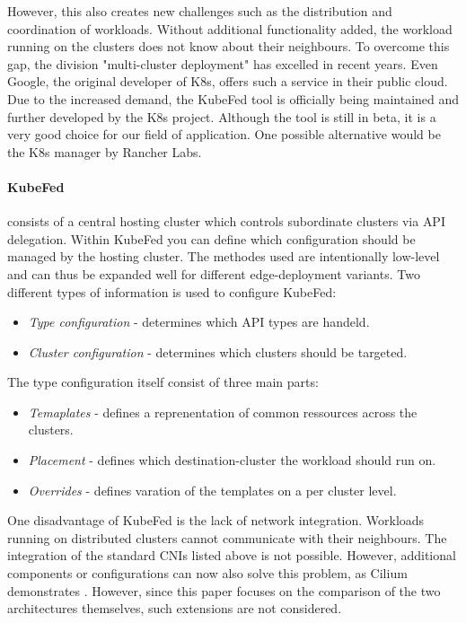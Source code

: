 \documentclass[MSC,Master,english]{twbook}%
\begin{document}
However, this also creates new challenges such as the distribution and coordination of workloads. Without additional functionality added, the workload running on the clusters does not know about their neighbours. To overcome this gap, the division  "multi-cluster deployment" has excelled in recent years. Even Google, the original developer of \ac{K8s}, offers such a service \cite{google-mcs} in their public cloud. Due to the increased demand, the \ac{KubeFed} tool is officially being maintained and further developed by the \ac{K8s} project\cite{kubefed-github}. Although the tool is still in beta, it is a very good choice for our field of application. One possible alternative would be the \ac{K8s} manager by Rancher Labs.

\paragraph{\ac{KubeFed}} consists of a central hosting cluster which controls subordinate clusters via \ac{API} delegation. Within \ac{KubeFed} you can define which configuration should be managed by the hosting cluster. The methodes used are intentionally low-level and can thus be expanded well for different edge-deployment variants. Two different types of information is used to configure \ac{KubeFed}\cite{kubefed-github}:

\begin{itemize}
    \item \textit{Type configuration} - determines which \ac{API} types are handeld.
    \item \textit{Cluster configuration} - determines which clusters should be targeted.
\end{itemize}

The type configuration itself consist of three main parts:

\begin{itemize}
    \item \textit{Temaplates} - defines a reprenentation of common ressources across the clusters.
    \item \textit{Placement} - defines which destination-cluster the workload should run on.
    \item \textit{Overrides} - defines varation of the templates on a per cluster level.
\end{itemize}

One disadvantage of KubeFed is the lack of network integration. Workloads running on distributed clusters cannot communicate with their neighbours. The integration of the standard CNIs listed above is not possible. However, additional components or configurations can now also solve this problem, as Cilium demonstrates \cite{ciliummesh}. However, since this paper focuses on the comparison of the two architectures themselves, such extensions are not considered.
\end{document}
